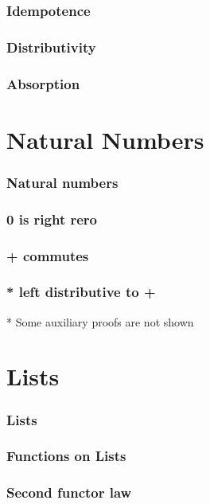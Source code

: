 \documentclass[xetex]{beamer}
\begin{document}
\begin{frame}
\frametitle{Idempotence}
\end{frame}
  
\begin{frame}
\frametitle{Distributivity}
\end{frame}
 
\begin{frame}
\frametitle{Absorption}
\end{frame}


\section{Natural Numbers}

\begin{frame}
\frametitle{Natural numbers}
\end{frame}

\begin{frame}
\frametitle{0 is right rero}
\end{frame}

\begin{frame}
\frametitle{+ commutes}
\end{frame}

\begin{frame}
\frametitle{* left distributive to +}
* Some auxiliary proofs are not shown
\end{frame}

\section{Lists}

\begin{frame}
\frametitle{Lists}
\end{frame}

\begin{frame}
\frametitle{Functions on Lists}
\end{frame}

\begin{frame}
\frametitle{Second functor law}
\end{frame}
\end{document}
